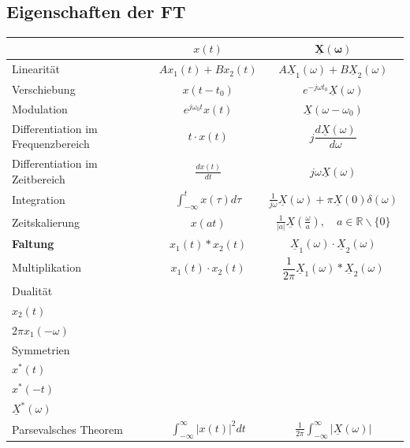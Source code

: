 \begin{multicols*}{2}
\subsection{Eigenschaften der FT}
{	\renewcommand{\arraystretch}{1.9}
\begin{tabularx}{1.03\columnwidth}{|X|c|c|}
	\hline & $x(t)$ & $\mathbf{\underline{X}(\omega)}$ \\
	\hline Linearität & $A x_{1}(t)+B x_{2}(t)$ & $A \underline{X}_{1}(\omega)+B \underline{X}_{2}(\omega)$ \\
	\hline  Verschiebung & $x(t-t_0)$ & $e^{-j \omega t_0} \underline{X}(\omega)$ \\
	\hline Modulation & $e^{j \omega_{0} t} x(t)$ & $\underline{X}\left(\omega-\omega_{0}\right)$ \\
	\hline 
		\small Differentiation im Frequenzbereich
	 & $t \cdot x(t)$ & $j \dfrac{d \underline{X}(\omega)}{d \omega}$ \\
	\hline 
		\small Differentiation
		im Zeitbereich & $\frac{d x(t)}{d t}$ & $j \omega \underline{X}(\omega)$ \\
	\hline Integration & $\int_{-\infty}^{t} x(\tau) d \tau$ & $\frac{1}{j \omega} \underline{X}(\omega)+\pi \underline{X}(0) \delta(\omega)$ \\
	\hline Zeitskalierung & $x(a t)$ & $\frac{1}{|a|} \underline{X}\left(\frac{\omega}{a}\right), \quad a \in \mathbb{R} \backslash\{0\}$ \\
	\hline \textbf{Faltung} & $x_{1}(t) * x_{2}(t)$ & $\underline{X}_{1}(\omega) \cdot \underline{X}_{2}(\omega)$ \\
	\hline Multiplikation & $x_{1}(t) \cdot x_{2}(t)$ & $\dfrac{1}{2 \pi} \underline{X}_{1}(\omega) * \underline{X}_{2}(\omega)$ \\
	\hline Dualität & \begin{tabular}{l}
		$x_{1}(t)$ \\
		$x_{2}(t)$
	\end{tabular} & \begin{tabular}{l}
		$x_{2}(\omega)$ \\
		$2 \pi x_{1}(-\omega)$
	\end{tabular} \\
	\hline Symmetrien & \begin{tabular}{c}
		$x(-t)$ \\
		$x^{*}(t)$ \\
		$x^{*}(-t)$
	\end{tabular} & \begin{tabular}{c}
		$\dfrac{X}{X^{*}}(-\omega)$ \\
		$\underline{X}^{*}(\omega)$
	\end{tabular} \\
	\hline Parsevalsches Theorem & $\int_{-\infty}^{\infty}|x(t)|^{2} d t$ & $\frac{1}{2 \pi} \int_{-\infty}^{\infty} \left|\underline{X}(\omega) \right| $\\
	\hline	
\end{tabularx} }


\end{multicols*}
